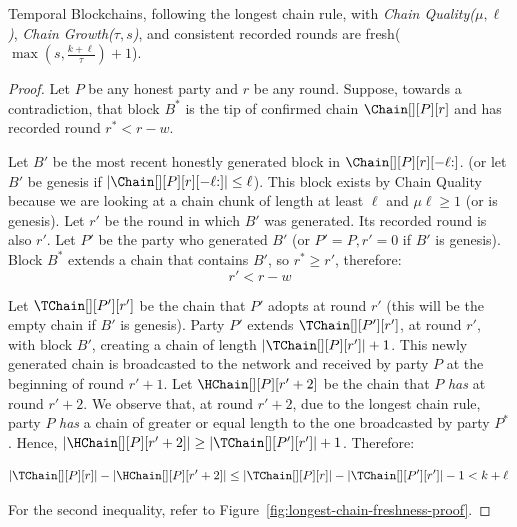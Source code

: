 \begin{theorem}\label{thm.longest-chain-freshness}
  Temporal Blockchains, following the longest chain rule,
  with \emph{Chain Quality($\mu,\ell$)},
  \emph{Chain Growth($\tau, s$)},
  and consistent recorded rounds
  are fresh($\max(s, \frac{k + \ell}{\tau}) + 1$).
\end{theorem}
\begin{proof}
  Let $P$ be any honest party and $r$ be any round.
  Suppose, towards a contradiction, that block $B^*$
  is the tip of confirmed chain $\Chain[][P][r]$ and has
  recorded round $r^* < r - w$.

  Let $B'$ be the most recent honestly generated block
  in $\Chain[][P][r][{-\ell}{:}]$.
  (or let $B'$ be genesis if $|\Chain[][P][r][{-\ell}{:}]| \leq \ell$).
  This block exists by
  Chain Quality because we are looking at a chain chunk of length at least $\ell$ and
  $\mu\ell \geq 1$ (or is genesis).
  Let $r'$ be the round in which $B'$ was generated.
  Its recorded round is also $r'$.
  Let $P'$ be the party who generated $B'$
  (or $P' = P, r' = 0$ if $B'$ is genesis).
  Block $B^*$ extends a chain that contains $B'$, so $r^* \geq r'$,
  therefore:
  \begin{equation}
    r' < r - w \label{eq:bitcoin-r-bound}
  \end{equation}

  Let $\TChain[][P'][r']$ be the chain that $P'$ adopts at
  round $r'$ (this will be the empty chain if $B'$ is genesis).
  Party $P'$ extends $\TChain[][P'][r']$, at round $r'$, with block $B'$,
  creating a chain of length $|\TChain[][P][r']| + 1$.
  This newly generated chain is broadcasted to the network and
  received by party $P$ at the beginning of round $r' + 1$.
  Let $\HChain[][P][r' + 2]$ be the chain
  that $P$ \emph{has} at round $r' + 2$.
  We observe that, at round $r' + 2$, due to the
  longest chain rule, party $P$ \emph{has} a chain of greater or equal
  length to the one broadcasted by party $P^*$. Hence,
  $|\HChain[][P][r' + 2]| \geq |\TChain[][P'][r']| + 1$. Therefore:

  \begin{equation}
    |\TChain[][P][r]| - |\HChain[][P][r' + 2]| \leq
     |\TChain[][P][r]| - |\TChain[][P'][r']| - 1 <
     k + \ell\, \label{eq:bitcoin-contradiction}
  \end{equation}

  For the second inequality, refer to Figure~\ref{fig:longest-chain-freshness-proof}.


\end{proof}
